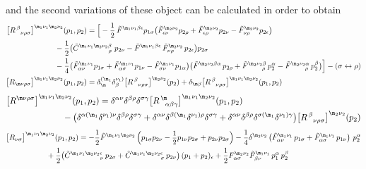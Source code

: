 \documentclass[a4paper,11pt,openright,twoside]{book}
\let\a=\alpha   \let\b=\beta   \let\g=\gamma   \let\d=\delta
\let\e=\epsilon \let\z=\zeta   \let\h=\eta     \let\q=\theta
\let\n=\nu      \let\x=\xi     \let\p=\pi      \let\r=\rho
\let\s=\sigma  \let\t=\tau     \let\u=\upsilon \let\f=\phi
\newcommand{\sdfrac}[2]{\mbox{\small$\displaystyle\frac{#1}{#2}$}}
\numberwithin{equation}{section}
\begin{document}
{{and the second variations of these object can be calculated in order to obtain
\begin{align}
	\big[R^{\,\b}_{\ \ \n\r\s}\big]^{\m_1\n_1\m_2\n_2}(p_1,p_2)&=\Big[-\frac{1}{2}\,\tilde F^{\m_1\n_1\b\epsilon}p_{1\s}\big(\tilde F^{\m_2\n_2}_{\e\n}p_{2\r}+\tilde F^{\m_2\n_2}_{\e\r}p_{2\n}-\tilde F^{\m_2\n_2}_{\n\r}p_{2\e}\big)\notag\\
	&\hspace{-1.5cm}-\frac{1}{2}\big(\tilde C^{\m_1\n_1\m_2\n_2\b}_{\hspace{1.4cm}\r}\ p_{2\n}-\tilde F^{\m_1\n_1\b\e}\,\tilde F^{\m_2\n_2}_{\n\r}\,p_{2\e}\big)p_{2\s}\notag\\
	&\hspace{-1.5cm}-\frac{1}{4}\big(\tilde F^{\m_1\n_1}_{\a\n}p_{1\s}+\tilde F^{\m_1\n_1}_{\a\s}p_{1\n}-\tilde F^{\m_1\n_1}_{\s\n}p_{1\a}\big)\big(\tilde F^{\m_2\n_2\b\a}\,p_{2\r}+\tilde F^{\m_2\n_2\b}_{\qquad\r}\,p_{2}^\a-\tilde F^{\m_2\n_2\a}_{\qquad\r}\,p_{2}^{\b}\big)\Big]-(\s\leftrightarrow \r)\\
	\big[R_{\m\n\r\s}\big]^{\m_1\n_1\m_2\n_2}(p_1,p_2)&=\d^{(\m_1}_\m\d^{\n_1)}_\b\big[R^{\,\b}_{\ \ \n\r\s}\big]^{\m_2\n_2}(p_2)+\d_{\m\b}\big[R^{\,\b}_{\ \ \n\r\s}\big]^{\m_1\n_1\m_2\n_2}(p_1,p_2)
\end{align}
\begin{align}
	\big[R^{\m\n\r\s}\big]^{\m_1\n_1\m_2\n_2}(p_1,p_2)&=\d^{\a\n}\d^{\b\r}\d^{\s\g}\big[R^{\,\m}_{\ \ \a\b\g}\big]^{\m_1\n_1\m_2\n_2}(p_1,p_2)\notag\\
	&\hspace{-1.5cm}-\big(\d^{\a(\m_1}\d^{\n_1)\n}\d^{\b\r}\d^{\s\g}+\d^{\a\n}\d^{\b(\m_1}\d^{\n_1)\r}\d^{\s\g}+\d^{\a\n}\d^{\b\r}\d^{\s(\m_1}\d^{\n_1)\g}\big)\big[R^{\,\b}_{\ \ \n\r\s}\big]^{\m_2\n_2}(p_2)
\end{align}
\begin{align}
	\big[R_{\n\s}\big]^{\m_1\n_1\m_2\n_2}(p_1,p_2)&=-\frac{1}{2}\tilde F^{\m_1\n_1\m_2\n_2}\left(p_{1\s}p_{2\n}-\sdfrac{1}{2}p_{1\n}p_{2\s}+p_{2\n}p_{2\s}\right)-\frac{1}{4}\d^{\m_2\n_2}\left(\tilde F^{\m_1\n_1}_{\a\n}\,p_{1\s}+\tilde F^{\m_1\n_1}_{\a\s}\,p_{1\n}\right)\,p_2^\a\notag\\
	&\hspace{-1.5cm}+\frac{1}{2}\big(\tilde C^{\m_1\n_1\m_2\n_2\e}_{\hspace{1.4cm}\n}\,p_{2\s}+\tilde C^{\m_1\n_1\m_2\n_2\e}_{\hspace{1.4cm}\s}\,p_{2\n}\big)\,(p_1+p_2)_{\e}+\frac{1}{2}F^{\m_2\n_2}_{\a\s}\tilde F^{\m_1\n_1}_{\b\n}\,p_1^\a\,p_2^\b\notag\\

\end{align}}}
\end{document}
